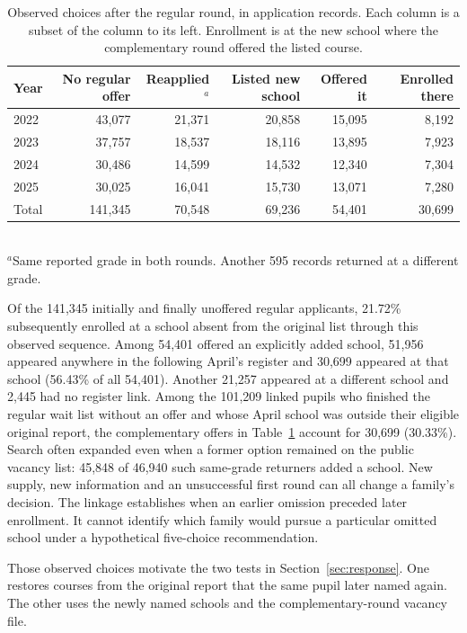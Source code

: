 \begin{table}[ht]\centering\small
\caption{Observed choices after the regular round, in application records. Each column is a subset of the column to its left. Enrollment is at the new school where the complementary round offered the listed course.}\label{tab:actual-search}
\begin{tabular}{@{}lrrrrr@{}}\toprule
Year & No regular offer & Reapplied$^{a}$ & Listed new school & Offered it & Enrolled there\\\midrule
2022 & 43,077 & 21,371 & 20,858 & 15,095 & 8,192\\
2023 & 37,757 & 18,537 & 18,116 & 13,895 & 7,923\\
2024 & 30,486 & 14,599 & 14,532 & 12,340 & 7,304\\
2025 & 30,025 & 16,041 & 15,730 & 13,071 & 7,280\\\midrule
Total & 141,345 & 70,548 & 69,236 & 54,401 & 30,699\\\bottomrule
\end{tabular}\\[2pt]
{\footnotesize $^{a}$Same reported grade in both rounds. Another 595 records returned at a different grade.}
\end{table}

Of the 141,345 initially and finally unoffered regular applicants, 21.72\% subsequently enrolled at a school absent from the original list through this observed sequence. Among 54,401 offered an explicitly added school, 51,956 appeared anywhere in the following April's register and 30,699 appeared at that school (56.43\% of all 54,401). Another 21,257 appeared at a different school and 2,445 had no register link. Among the 101,209 linked pupils who finished the regular wait list without an offer and whose April school was outside their eligible original report, the complementary offers in Table~\ref{tab:actual-search} account for 30,699 (30.33\%). Search often expanded even when a former option remained on the public vacancy list: 45,848 of 46,940 such same-grade returners added a school. New supply, new information and an unsuccessful first round can all change a family's decision. The linkage establishes when an earlier omission preceded later enrollment. It cannot identify which family would pursue a particular omitted school under a hypothetical five-choice recommendation.

Those observed choices motivate the two tests in Section~\ref{sec:response}. One restores courses from the original report that the same pupil later named again. The other uses the newly named schools and the complementary-round vacancy file.
